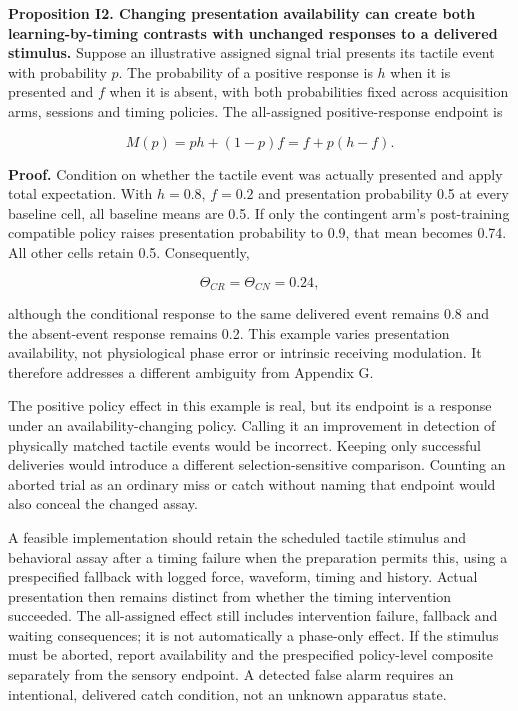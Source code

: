 \documentclass[
  american,
  11pt,
  letterpaper,
]{article}
\begin{document}
\textbf{Proposition I2. Changing presentation availability can create both learning-by-timing contrasts with unchanged responses to a delivered stimulus.} Suppose an illustrative assigned signal trial presents its tactile event with probability \(p\). The probability of a positive response is \(h\) when it is presented and \(f\) when it is absent, with both probabilities fixed across acquisition arms, sessions and timing policies. The all-assigned positive-response endpoint is

\begin{equation}
M(p)=p h+(1-p)f=f+p(h-f).\tag{I3}
\end{equation}

\textbf{Proof.} Condition on whether the tactile event was actually presented and apply total expectation. With \(h=0.8\), \(f=0.2\) and presentation probability 0.5 at every baseline cell, all baseline means are 0.5. If only the contingent arm's post-training compatible policy raises presentation probability to 0.9, that mean becomes 0.74. All other cells retain 0.5. Consequently,

\begin{equation}
\Theta_{CR}=\Theta_{CN}=0.24,\tag{I4}
\end{equation}

although the conditional response to the same delivered event remains 0.8 and the absent-event response remains 0.2. This example varies presentation availability, not physiological phase error or intrinsic receiving modulation. It therefore addresses a different ambiguity from Appendix G.

The positive policy effect in this example is real, but its endpoint is a response under an availability-changing policy. Calling it an improvement in detection of physically matched tactile events would be incorrect. Keeping only successful deliveries would introduce a different selection-sensitive comparison. Counting an aborted trial as an ordinary miss or catch without naming that endpoint would also conceal the changed assay.

A feasible implementation should retain the scheduled tactile stimulus and behavioral assay after a timing failure when the preparation permits this, using a prespecified fallback with logged force, waveform, timing and history. Actual presentation then remains distinct from whether the timing intervention succeeded. The all-assigned effect still includes intervention failure, fallback and waiting consequences; it is not automatically a phase-only effect. If the stimulus must be aborted, report availability and the prespecified policy-level composite separately from the sensory endpoint. A detected false alarm requires an intentional, delivered catch condition, not an unknown apparatus state.
\end{document}

